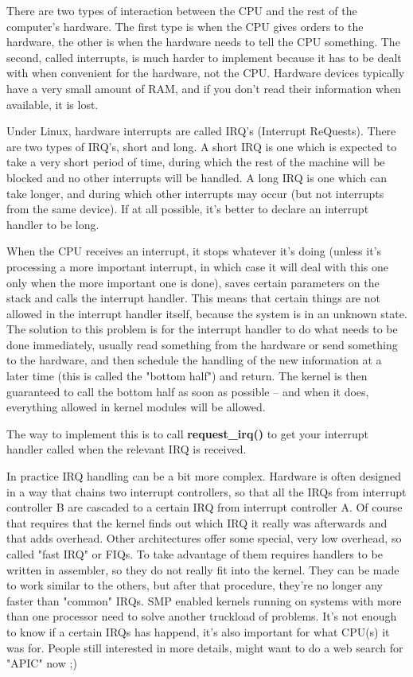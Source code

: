 \documentclass[10pt, oneside]{book}
\begin{document}
There are two types of interaction between the CPU and the rest of the computer's hardware. The first type is when the CPU gives orders to the hardware, the other is when the hardware needs to tell the CPU something. The second, called interrupts, is much harder to implement because it has to be dealt with when convenient for the hardware, not the CPU. Hardware devices typically have a very small amount of RAM, and if you don't read their information when available, it is lost.

Under Linux, hardware interrupts are called IRQ's (Interrupt ReQuests). There are two types of IRQ's, short and long. A short IRQ is one which is expected to take a very short period of time, during which the rest of the machine will be blocked and no other interrupts will be handled. A long IRQ is one which can take longer, and during which other interrupts may occur (but not interrupts from the same device). If at all possible, it's better to declare an interrupt handler to be long.

When the CPU receives an interrupt, it stops whatever it's doing (unless it's processing a more important interrupt, in which case it will deal with this one only when the more important one is done), saves certain parameters on the stack and calls the interrupt handler. This means that certain things are not allowed in the interrupt handler itself, because the system is in an unknown state. The solution to this problem is for the interrupt handler to do what needs to be done immediately, usually read something from the hardware or send something to the hardware, and then schedule the handling of the new information at a later time (this is called the "bottom half") and return. The kernel is then guaranteed to call the bottom half as soon as possible -- and when it does, everything allowed in kernel modules will be allowed.

The way to implement this is to call \textbf{request\_irq()} to get your interrupt handler called when the relevant IRQ is received.

In practice IRQ handling can be a bit more complex. Hardware is often designed in a way that chains two interrupt controllers, so that all the IRQs from interrupt controller B are cascaded to a certain IRQ from interrupt controller A. Of course that requires that the kernel finds out which IRQ it really was afterwards and that adds overhead. Other architectures offer some special, very low overhead, so called "fast IRQ" or FIQs. To take advantage of them requires handlers to be written in assembler, so they do not really fit into the kernel. They can be made to work similar to the others, but after that procedure, they're no longer any faster than "common" IRQs. SMP enabled kernels running on systems with more than one processor need to solve another truckload of problems. It's not enough to know if a certain IRQs has happend, it's also important for what CPU(s) it was for. People still interested in more details, might want to do a web search for "APIC" now ;)
\end{document}
